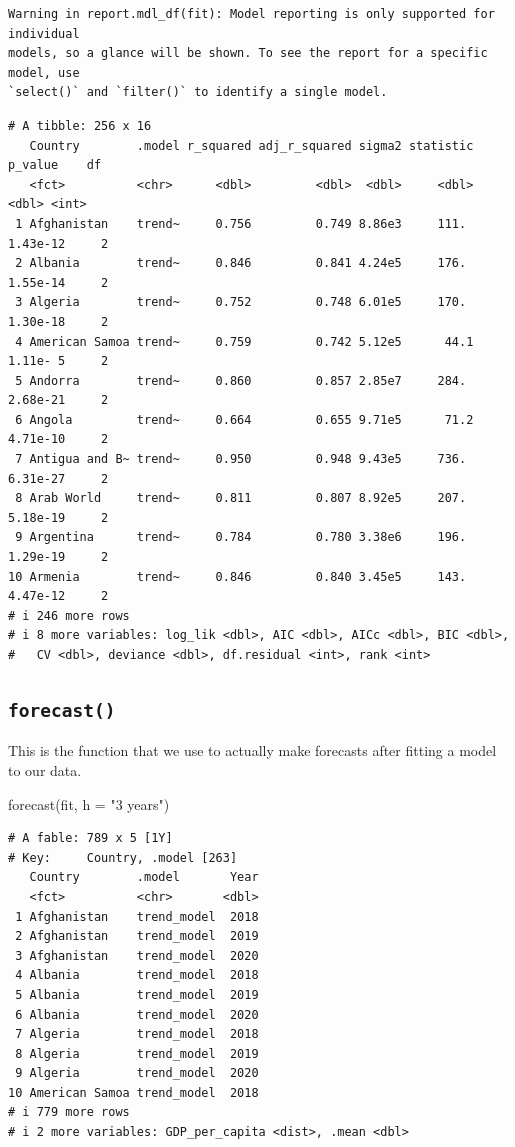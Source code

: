 \documentclass[
  letterpaper,
  DIV=11,
  numbers=noendperiod]{scrartcl}
\newenvironment{Shaded}{\begin{snugshade}}{\end{snugshade}}
\newcommand{\AttributeTok}[1]{\textcolor[rgb]{0.40,0.45,0.13}{#1}}
\newcommand{\FunctionTok}[1]{\textcolor[rgb]{0.28,0.35,0.67}{#1}}
\newcommand{\NormalTok}[1]{\textcolor[rgb]{0.00,0.23,0.31}{#1}}
\newcommand{\StringTok}[1]{\textcolor[rgb]{0.13,0.47,0.30}{#1}}
\begin{document}
\begin{verbatim}
Warning in report.mdl_df(fit): Model reporting is only supported for individual
models, so a glance will be shown. To see the report for a specific model, use
`select()` and `filter()` to identify a single model.
\end{verbatim}

\begin{verbatim}
# A tibble: 256 x 16
   Country        .model r_squared adj_r_squared sigma2 statistic  p_value    df
   <fct>          <chr>      <dbl>         <dbl>  <dbl>     <dbl>    <dbl> <int>
 1 Afghanistan    trend~     0.756         0.749 8.86e3     111.  1.43e-12     2
 2 Albania        trend~     0.846         0.841 4.24e5     176.  1.55e-14     2
 3 Algeria        trend~     0.752         0.748 6.01e5     170.  1.30e-18     2
 4 American Samoa trend~     0.759         0.742 5.12e5      44.1 1.11e- 5     2
 5 Andorra        trend~     0.860         0.857 2.85e7     284.  2.68e-21     2
 6 Angola         trend~     0.664         0.655 9.71e5      71.2 4.71e-10     2
 7 Antigua and B~ trend~     0.950         0.948 9.43e5     736.  6.31e-27     2
 8 Arab World     trend~     0.811         0.807 8.92e5     207.  5.18e-19     2
 9 Argentina      trend~     0.784         0.780 3.38e6     196.  1.29e-19     2
10 Armenia        trend~     0.846         0.840 3.45e5     143.  4.47e-12     2
# i 246 more rows
# i 8 more variables: log_lik <dbl>, AIC <dbl>, AICc <dbl>, BIC <dbl>,
#   CV <dbl>, deviance <dbl>, df.residual <int>, rank <int>
\end{verbatim}

\subsection{\texorpdfstring{\texttt{forecast()}}{forecast()}}\label{forecast}

This is the function that we use to actually make forecasts after
fitting a model to our data.

\begin{Shaded}
\begin{Highlighting}[]
\FunctionTok{forecast}\NormalTok{(fit, }\AttributeTok{h =} \StringTok{"3 years"}\NormalTok{)}
\end{Highlighting}
\end{Shaded}

\begin{verbatim}
# A fable: 789 x 5 [1Y]
# Key:     Country, .model [263]
   Country        .model       Year
   <fct>          <chr>       <dbl>
 1 Afghanistan    trend_model  2018
 2 Afghanistan    trend_model  2019
 3 Afghanistan    trend_model  2020
 4 Albania        trend_model  2018
 5 Albania        trend_model  2019
 6 Albania        trend_model  2020
 7 Algeria        trend_model  2018
 8 Algeria        trend_model  2019
 9 Algeria        trend_model  2020
10 American Samoa trend_model  2018
# i 779 more rows
# i 2 more variables: GDP_per_capita <dist>, .mean <dbl>
\end{verbatim}
\end{document}
